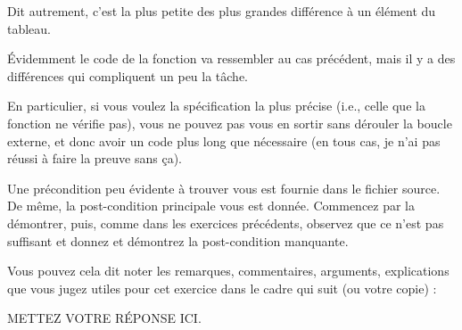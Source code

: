 \documentclass[11pt,answers]{exam}
\begin{document}
\begin{questions}
    Dit autrement, c’est la plus petite des plus grandes différence à un élément du tableau.

    Évidemment le code de la fonction va ressembler au cas précédent, mais il y a des différences qui compliquent un peu la tâche.

    En particulier, si vous voulez la spécification la plus précise (i.e., celle que la fonction  ne vérifie pas), vous ne pouvez pas vous en sortir sans dérouler la boucle externe, et donc avoir un code plus long que nécessaire (en tous cas, je n’ai pas réussi à faire la preuve sans ça).

    Une précondition peu évidente à trouver vous est fournie dans le fichier source.
    De même, la post-condition principale vous est donnée. Commencez par la démontrer, puis, comme dans les exercices précédents, observez que ce n’est pas suffisant et donnez et démontrez la post-condition manquante.

    Vous pouvez cela dit noter les remarques, commentaires, arguments, explications que vous jugez utiles pour cet exercice dans le cadre qui suit (ou votre copie) :

    \begin{solutionorbox}
        METTEZ VOTRE RÉPONSE ICI.
    \end{solutionorbox}


\end{questions}
\end{document}
